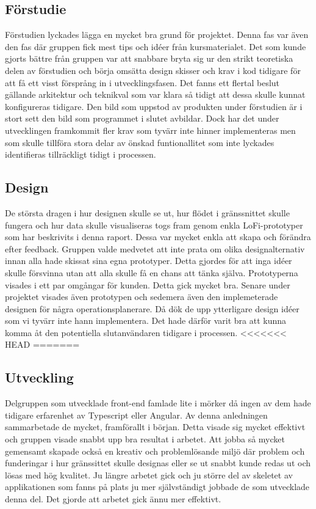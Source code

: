 \subsection{Förstudie}
Förstudien lyckades lägga en mycket bra grund för projektet. Denna fas var även den fas där gruppen fick mest tips och idéer från kursmaterialet. Det som kunde gjorts bättre från gruppen var att snabbare bryta sig ur den strikt teoretiska delen av förstudien och börja omsätta design skisser och krav i kod tidigare för att få ett visst försprång in i utvecklingsfasen. Det fanns ett flertal beslut gällande arkitektur och teknikval som var klara så tidigt att dessa skulle kunnat konfigureras tidigare. Den bild som uppstod av produkten under förstudien är i stort sett den bild som programmet i slutet avbildar. Dock har det under utvecklingen framkommit fler krav som tyvärr inte hinner implementeras men som skulle tillföra stora delar av önskad funtionallitet som inte lyckades identifieras tillräckligt tidigt i processen.

\subsection{Design}
De största dragen i hur designen skulle se ut, hur flödet i gränssnittet skulle fungera och hur data skulle visualiseras togs fram genom enkla LoFi-prototyper som har beskrivits i denna raport. Dessa var mycket enkla att skapa och förändra efter feedback. Gruppen valde medvetet att inte prata om olika designalternativ innan alla hade skissat sina egna prototyper. Detta gjordes för att inga idéer skulle försvinna utan att alla skulle få en chans att tänka själva. Prototyperna visades i ett par omgångar för kunden. Detta gick mycket bra. Senare under projektet visades även prototypen och sedemera även den implemeterade designen för några operationsplanerare. Då dök de upp ytterligare design idéer som vi tyvärr inte hann implementera. Det hade därför varit bra att kunna komma åt den potentiella slutanvändaren tidigare i processen.
<<<<<<< HEAD
=======


\subsection{Utveckling}
Delgruppen som utvecklade front-end famlade lite i mörker då ingen av dem hade tidigare erfarenhet av Typescript eller Angular. Av denna anledningen sammarbetade de mycket, framförallt i början. Detta visade sig mycket effektivt och gruppen visade snabbt upp bra resultat i arbetet. Att jobba så mycket gemensamt skapade också en kreativ och problemlösande miljö där problem och funderingar i hur gränssittet skulle designas eller se ut snabbt kunde redas ut och lösas med hög kvalitet. Ju längre arbetet gick och ju större del av skeletet av applikationen som fanns på plats ju mer självständigt jobbade de som utvecklade denna del. Det gjorde att arbetet gick ännu mer effektivt.

